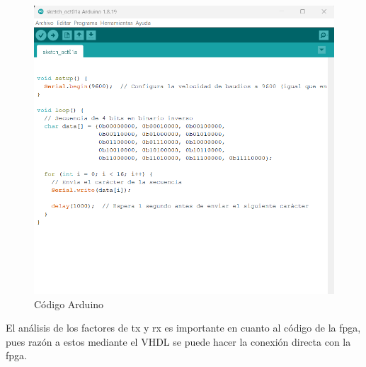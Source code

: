 \documentclass[journal]{IEEEtran}
\begin{document}
\begin{figure}[H]
    \centering
    \includegraphics[scale=0.4]{images/codex ardui.png}
    \caption{Código Arduino}
\end{figure}

El análisis de los factores de tx y rx es importante en cuanto al código de la fpga, pues razón a estos mediante el VHDL se puede hacer la conexión directa con la fpga. 
\end{document}
